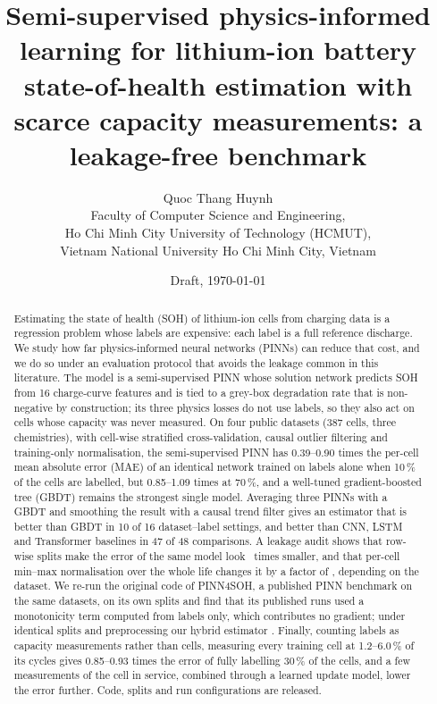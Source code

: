 \documentclass[11pt,a4paper]{article}
\title{Semi-supervised physics-informed learning for lithium-ion battery state-of-health estimation
  with scarce capacity measurements: a leakage-free benchmark}
\author{Quoc Thang Huynh\\[2pt]
  \small Faculty of Computer Science and Engineering,\\
  \small Ho Chi Minh City University of Technology (HCMUT),\\
  \small Vietnam National University Ho Chi Minh City, Vietnam}
\date{Draft, \today}
\begin{document}
\maketitle

\begin{abstract}
Estimating the state of health (SOH) of lithium-ion cells from charging data is a regression problem whose labels are
expensive: each label is a full reference discharge. We study how far physics-informed neural networks (PINNs) can
reduce that cost, and we do so under an evaluation protocol that avoids the leakage common in this literature. The
model is a semi-supervised PINN whose solution network predicts SOH from 16 charge-curve features and is tied to a
grey-box degradation rate that is non-negative by construction; its three physics losses do not use labels, so they
also act on cells whose capacity was never measured. On four public datasets (387 cells, three chemistries), with
cell-wise stratified cross-validation, causal outlier filtering and training-only normalisation, the semi-supervised
PINN has 0.39--0.90 times the per-cell mean absolute error (MAE) of an identical network trained on labels alone when
10\,\% of the cells are labelled, but 0.85--1.09 times at 70\,\%, and a well-tuned gradient-boosted tree (GBDT)
remains the strongest single model. Averaging three PINNs with a GBDT and smoothing the
result with a causal trend filter gives an estimator that is better than GBDT in 10 of 16 dataset--label settings,
and better than CNN, LSTM and Transformer baselines in 47 of 48 comparisons. A leakage audit shows that row-wise
splits make the error of the same model look \LeakRowAbstract\ times smaller, and that per-cell min--max
normalisation over the whole life changes it by a factor of \LeakMinmaxAbstract, depending on the dataset. We re-run the original code of PINN4SOH, a published PINN
benchmark on the same datasets, on its own splits and find that its published runs used a monotonicity term computed
from labels only, which contributes no gradient; under identical splits and preprocessing our hybrid estimator \BenchAbstract. Finally, counting
labels as capacity measurements rather than cells, measuring every training cell at 1.2--6.0\,\% of its cycles gives
0.85--0.93 times the error of fully labelling 30\,\% of the cells, and a few measurements of the cell in service,
combined through a learned update model, lower the error further. Code, splits and run configurations are released.
\end{abstract}
\end{document}
